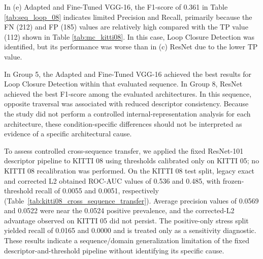 \documentclass{ieeeaccess}
\newenvironment{revisionblock}
{%
  \par
  \begingroup
  \setlength{\fboxsep}{1pt}%
  \setlength{\OuterFrameSep}{0pt}%
  \def\FrameCommand##1{%
    \colorbox{white}{\color{revisionred}##1}%
  }%
  \MakeFramed{%
    \advance\hsize-2\fboxsep
    \FrameRestore
  }%
}
{%
  \endMakeFramed
  \endgroup
  \par
}
\renewenvironment{revisionblock}
  {\par\begingroup\color{revisionred}}
  {\par\endgroup}
\begin{document}
In (e) Adapted and Fine-Tuned VGG-16, the F1-score of 0.361 in Table \ref{tab:seq_loop_08} indicates limited Precision and Recall, primarily because the FN (212) and FP (185) values are relatively high compared with the TP value (112) shown in Table \ref{tab:mc_kitti08}. In this case, Loop Closure Detection was identified, but its performance was worse than in (c) ResNet due to the lower TP value.

\begin{revisionblock}
In Group 5, the Adapted and Fine-Tuned VGG-16 achieved the best results for Loop Closure Detection within that evaluated sequence. In Group 8, ResNet achieved the best F1-score among the evaluated architectures. In this sequence, opposite traversal was associated with reduced descriptor consistency. Because the study did not perform a controlled internal-representation analysis for each architecture, these condition-specific differences should not be interpreted as evidence of a specific architectural cause.
\end{revisionblock}


\pagebreak[4]

To assess controlled cross-sequence transfer, we applied the fixed ResNet-101 descriptor pipeline to KITTI 08 using thresholds calibrated only on KITTI 05; no KITTI 08 recalibration was performed. On the KITTI 08 test split, legacy exact and corrected L2 obtained ROC-AUC values of 0.536 and 0.485, with frozen-threshold recall of 0.0055 and 0.0051, respectively (Table~\ref{tab:kitti08_cross_sequence_transfer}). Average precision values of 0.0569 and 0.0522 were near the 0.0524 positive prevalence, and the corrected-L2 advantage observed on KITTI 05 did not persist. The positive-only stress split yielded recall of 0.0165 and 0.0000 and is treated only as a sensitivity diagnostic. These results indicate a sequence/domain generalization limitation of the fixed descriptor-and-threshold pipeline without identifying its specific cause.
\end{document}
